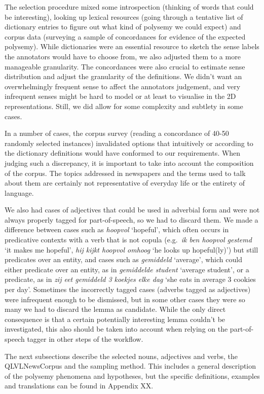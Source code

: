 \documentclass[
]{book}
\begin{document}
The selection procedure mixed some introspection (thinking of words that could be interesting), looking up lexical resources (going through a tentative list of dictionary entries to figure out what kind of polysemy we could expect) and corpus data (surveying a sample of concordances for evidence of the expected polysemy). While dictionaries were an essential resource to sketch the sense labels the annotators would have to choose from, we also adjusted them to a more manageable granularity. The concordances were also crucial to estimate sense distribution and adjust the granularity of the definitions. We didn't want an overwhelmingly frequent sense to affect the annotators judgement, and very infrequent senses might be hard to model or at least to visualise in the 2D representations. Still, we did allow for some complexity and subtlety in some cases.

In a number of cases, the corpus survey (reading a concordance of 40-50 randomly selected instances) invalidated options that intuitively or according to the dictionary definitions would have conformed to our requirements. When judging such a discrepancy, it is important to take into account the composition of the corpus. The topics addressed in newspapers and the terms used to talk about them are certainly not representative of everyday life or the entirety of language.

We also had cases of adjectives that could be used in adverbial form and were not always properly tagged for part-of-speech, so we had to discard them. We made a difference between cases such as \emph{hoopvol} `hopeful', which often occurs in predicative contexts with a verb that is not copula (e.g.~\emph{ik ben hoopvol gestemd} `it makes me hopeful', \emph{hij kijkt hoopvol omhoog} `he looks up hopeful(ly)') but still predicates over an entity, and cases such as \emph{gemiddeld} `average', which could either predicate over an entity, as in \emph{gemiddelde student} `average student', or a predicate, as in \emph{zij eet gemiddeld 3 koekjes elke dag} `she eats in average 3 cookies per day'. Sometimes the incorrectly tagged cases (adverbs tagged as adjectives) were infrequent enough to be dismissed, but in some other cases they were so many we had to discard the lemma as candidate. While the only direct consequence is that a certain potentially interesting lemma couldn't be investigated, this also should be taken into account when relying on the part-of-speech tagger in other steps of the workflow.

The next subsections describe the selected nouns, adjectives and verbs, the QLVLNewsCorpus and the sampling method. This includes a general description of the polysemy phenomena and hypotheses, but the specific definitions, examples and translations can be found in Appendix XX.
\end{document}

